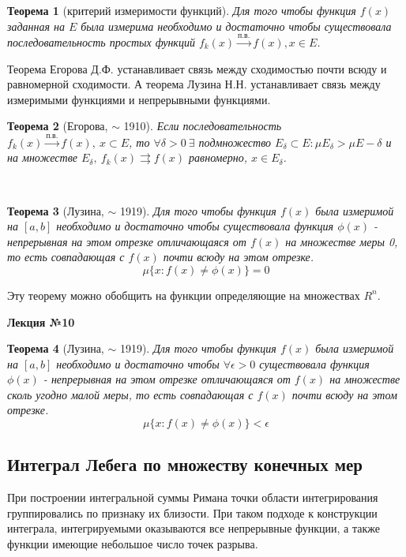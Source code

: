 \documentclass[14pt,a4paper]{extarticle}
\newtheorem{theorem}{Теорема}[section]
\theoremstyle{definition}
\theoremstyle{remark}
\renewcommand{\[}{\begin{dmath*}[compact]}
\renewcommand{\]}{\end{dmath*}}
\newcommand{\ds}{\displaystyle}
\newcommand{\sep}{ , \ \allowbreak }
\begin{document}
\begin{theorem}[критерий измеримости функций]
  Для того чтобы функция $f(x)$ заданная на $E$ была измерима
  необходимо и достаточно чтобы существовала последовательность
  простых функций $f_k (x) \xrightarrow{\text{п.в.}} f(x), x \in E$.
\end{theorem}

Теорема Егорова Д.Ф. устанавливает связь между сходимостью почти всюду и
равномерной сходимости.
А теорема Лузина Н.Н. устанавливает связь между измеримыми функциями и
непрерывными функциями.

\begin{theorem}[Егорова, $\sim$ 1910]
  Если последовательность
  $\ds f_k(x) \xrightarrow{\text{п.в.}} f(x) \sep x \subset E$,
  то $\forall \delta > 0 \ \exists$ подмножество
  $ E_\delta \subset E : \mu E_\delta > \mu E - \delta $ и на множестве
  $E_\delta \sep f_k(x) \rightrightarrows f(x)$ равномерно, $x \in E_\delta$.
\end{theorem}\

\begin{theorem}[Лузина, $\sim$ 1919]
  Для того чтобы функция $f(x)$ была измеримой на $[a,b]$
  необходимо и достаточно чтобы существовала функция $\phi(x)$ -
  непрерывная на этом отрезке отличающаяся от $f(x)$ на множестве меры 0,
  то есть совпадающая с $f(x)$ почти всюду на этом отрезке.
  \[\mu\{x:f(x) \neq \phi (x)\} = 0\]
\end{theorem}

Эту теорему можно обобщить на функции определяющие на множествах $R^n$.

\textbf{Лекция №10}

\begin{theorem}[Лузина, $\sim$ 1919]
  Для того чтобы функция $f(x)$ была измеримой на $[a,b]$ необходимо и
  достаточно чтобы $\forall \epsilon > 0$ существовала функция $\phi(x)$ -
  непрерывная на этом отрезке отличающаяся от $f(x)$ на множестве
  сколь угодно малой меры, то есть совпадающая с $f(x)$
  почти всюду на этом отрезке.
  \[\mu\{x:f(x) \neq \phi (x)\} < \epsilon\]
\end{theorem}

\subsection{Интеграл Лебега по множеству конечных мер}

При построении интегральной суммы Римана точки области интегрирования
группировались по признаку их близости.
При таком подходе к конструкции интеграла,
интегрируемыми оказываются все непрерывные функции,
а также функции имеющие небольшое число точек разрыва.
\end{document}

